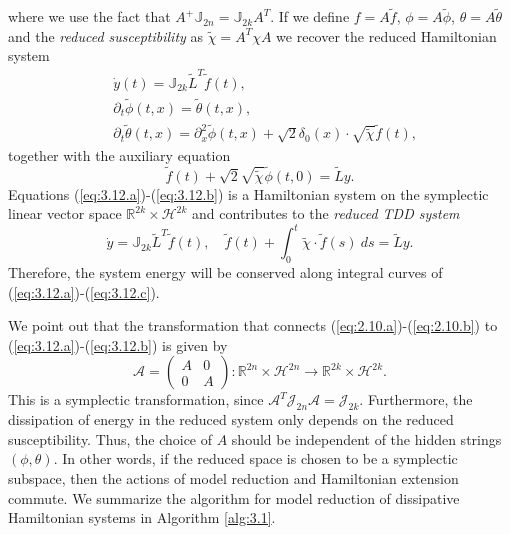where we use the fact that $A^+\mathbb J_{2n} = \mathbb{J}_{2k} A^T$. If we define $f = A \tilde f$, $\phi = A \tilde \phi$, $\theta = A\tilde \theta$ and the \emph{reduced susceptibility} as $\tilde \chi = A^T \chi A$ we recover the reduced Hamiltonian system
\begin{subequations}
\begin{align}
		\label{eq:3.12.a} & \dot{y}(t) = \mathbb J_{2k} {\tilde L}^T \tilde f(t), \\
		\label{eq:3.12.c} & \partial_t \tilde \phi(t,x) = \tilde \theta(t,x),\\
		\label{eq:3.12.b} & \partial_t \tilde \theta(t,x) = \partial_x^2 \tilde \phi(t,x) + \sqrt 2 \delta_0(x) \cdot \sqrt{\tilde \chi}  \tilde f(t),
\end{align}
\end{subequations}
together with the auxiliary equation
\begin{equation} \label{eq:3.13}
	\tilde f(t) + \sqrt{2} \sqrt{\tilde \chi} \tilde \phi(t,0) = \tilde L y.
\end{equation}
Equations (\ref{eq:3.12.a})-(\ref{eq:3.12.b}) is a Hamiltonian system on the symplectic linear vector space $\mathbb R^{2k} \times \mathcal H^{2k}$ and contributes to the \emph{reduced TDD system}
\begin{equation}
	\dot {y} = \mathbb J_{2k} \tilde L^T \tilde f(t), \quad \tilde f(t) + \int_0^t \tilde \chi\cdot \tilde f(s)\ ds = \tilde L y.
\end{equation}
Therefore, the system energy will be conserved along integral curves of (\ref{eq:3.12.a})-(\ref{eq:3.12.c}).

We point out that the transformation that connects (\ref{eq:2.10.a})-(\ref{eq:2.10.b}) to (\ref{eq:3.12.a})-(\ref{eq:3.12.b}) is given by
\begin{equation}
	\mathcal A = \begin{pmatrix}
		A& 0 \\
		0& A
	\end{pmatrix} : \mathbb R^{2n} \times \mathcal H^{2n} \to \mathbb R^{2k} \times \mathcal H^{2k}.
\end{equation}
This is a symplectic transformation, since $\mathcal A^T \mathcal J_{2n} \mathcal A = \mathcal J_{2k}$. Furthermore, the dissipation of energy in the reduced system only depends on the reduced susceptibility. Thus, the choice of $A$ should be independent of the hidden strings $(\phi, \theta)$. In other words, if the reduced space is chosen to be a symplectic subspace, then the actions of model reduction and Hamiltonian extension commute. We summarize the algorithm for model reduction of dissipative Hamiltonian systems in Algorithm \ref{alg:3.1}.

